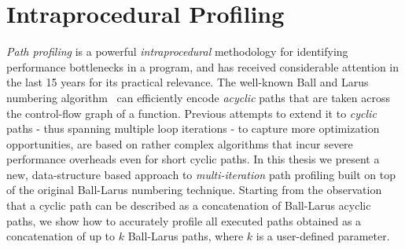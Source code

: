 \section{Intraprocedural Profiling}

{\em Path profiling} is a powerful {\em intraprocedural} methodology for identifying performance bottlenecks in a program, and has received considerable attention in the last 15 years for its practical relevance. The well-known Ball and Larus numbering algorithm~\cite{Ball96} can efficiently encode {\em acyclic} paths that are taken across the control-flow graph of a function. Previous attempts to extend it to {\em cyclic} paths - thus spanning multiple loop iterations - to capture more optimization opportunities, are based on rather complex algorithms that incur severe performance overheads even for short cyclic paths. In this thesis we present a new, data-structure based approach to {\em multi-iteration} path profiling built on top of the original Ball-Larus numbering technique. Starting from the observation that a cyclic path can be described as a concatenation of Ball-Larus acyclic paths, we show how to accurately profile all executed paths obtained as a concatenation of up to $k$ Ball-Larus paths, where $k$ is a user-defined parameter.



